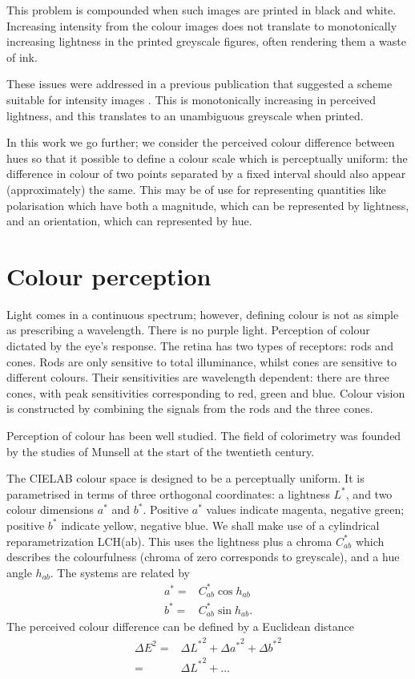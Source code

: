 \documentclass[useAMS,usedcolumn,usegraphicx,usenatbib]{mn2e}
\begin{document}
This problem is compounded when such images are printed in black and white. Increasing intensity from the colour images does not translate to monotonically increasing lightness in the printed greyscale figures, often rendering them a waste of ink.

These issues were addressed in a previous publication that suggested a scheme suitable for intensity images \cite{Green2011}. This is monotonically increasing in perceived lightness, and this translates to an unambiguous greyscale when printed.

In this work we go further; we consider the perceived colour difference between hues so that it possible to define a colour scale which is perceptually uniform: the difference in colour of two points separated by a fixed interval should also appear (approximately) the same. This may be of use for representing quantities like polarisation which have both a magnitude, which can be represented by lightness, and an orientation, which can represented by hue.

\section{Colour perception}

Light comes in a continuous spectrum; however, defining colour is not as simple as prescribing a wavelength. There is no purple light. Perception of colour dictated by the eye's response. The retina has two types of receptors: rods and cones. Rods are only sensitive to total illuminance, whilst cones are sensitive to different colours. Their sensitivities are wavelength dependent: there are three cones, with peak sensitivities corresponding to red, green and blue. Colour vision is constructed by combining the signals from the rods and the three cones.

Perception of colour has been well studied. The field of colorimetry was founded by the studies of Munsell at the start of the twentieth century.

The CIELAB colour space is designed to be a perceptually uniform. It is parametrised in terms of three orthogonal coordinates: a lightness $L^\ast$, and two colour dimensions $a^\ast$ and $b^\ast$. Positive $a^\ast$ values indicate magenta, negative green; positive $b^\ast$ indicate yellow, negative blue. We shall make use of a cylindrical reparametrization LCH(ab). This uses the lightness plus a chroma $C^\ast_{ab}$ which describes the colourfulness (chroma of zero corresponds to greyscale), and a hue angle $h_{ab}$. The systems are related by
\begin{align}
a^\ast = {} & C^\ast_{ab}\cos h_{ab} \\
b^\ast = {} & C^\ast_{ab}\sin h_{ab}.
\end{align}
The perceived colour difference can be defined by a Euclidean distance
\begin{align}
{\Delta E}^2 = {} & {\Delta L^\ast}^2 + {\Delta a^\ast}^2 + {\Delta b^\ast}^2 \\
 = {} &  {\Delta L^\ast}^2 + \ldots
\end{align}
\end{document}
